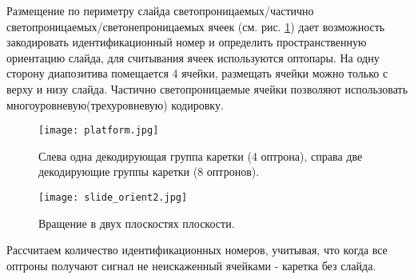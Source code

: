 Размещение по периметру слайда светопроницаемых/частично светопроницаемых/светонепроницаемых ячеек (см. рис. \ref{fig:platform}) дает возможность закодировать идентификационный номер и определить пространственную ориентацию слайда, для считывания ячеек используются оптопары. На одну сторону диапозитива помещается 4 ячейки, размещать ячейки можно только с верху и низу слайда. Частично светопроницаемые ячейки  позволяют использовать многоуровневую(трехуровневую) кодировку.
\begin{figure}[ht]
	\centering
     \texttt{[image: platform.jpg]}
	\caption
	{
	Слева одна декодирующая группа каретки (4 оптрона), справа две декодирующие группы каретки (8 оптронов).
	}
	\label{fig:platform}
\end{figure}

\begin{figure}[ht]
	\centering
     \texttt{[image: slide\_orient2.jpg]}
	\caption
	{
	Вращение в двух плоскостях плоскости.
	}
	\label{fig:slide_orient2}
\end{figure}
Рассчитаем количество идентификационных номеров, учитывая, что когда все оптроны получают сигнал не неискаженный ячейками - каретка без слайда.

